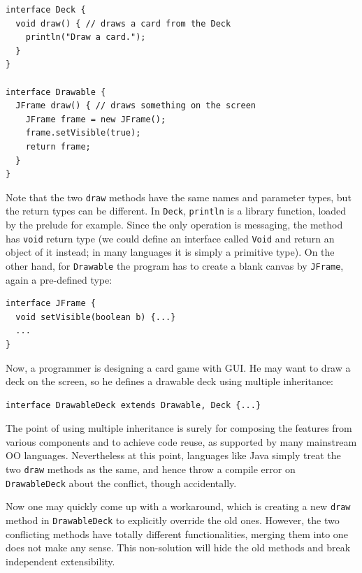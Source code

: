 \vspace{3pt}\begin{lstlisting}
interface Deck {
  void draw() { // draws a card from the Deck
    println("Draw a card.");
  }
}

interface Drawable {
  JFrame draw() { // draws something on the screen
    JFrame frame = new JFrame();
    frame.setVisible(true);
    return frame;
  }
}
\end{lstlisting}\vspace{3pt}
Note that the two \lstinline|draw| methods have the same names and parameter types,
but the return types can be different. In \lstinline|Deck|, \lstinline|println| is a
library function, loaded by the prelude for example. Since the only operation is messaging,
the method has \lstinline|void| return type (we could define an interface called \lstinline|Void|
and return an object of it instead; in many languages it is simply a primitive type). On the other hand, for \lstinline|Drawable|
the program has to create a blank canvas by \lstinline|JFrame|, again a pre-defined type:

\vspace{3pt}\begin{lstlisting}
interface JFrame {
  void setVisible(boolean b) {...}
  ...
}
\end{lstlisting}\vspace{3pt}
Now, a programmer is designing a
card game with GUI. He may want to draw a deck on the screen, so he defines a drawable
deck using multiple inheritance:

\vspace{3pt}\begin{lstlisting}
interface DrawableDeck extends Drawable, Deck {...} 
\end{lstlisting}\vspace{3pt}
The point of using multiple inheritance is surely for composing the features from various 
components and to achieve code reuse, as supported by many mainstream OO
languages. Nevertheless at this point, languages like Java simply treat the two \lstinline|draw| methods
as the same, and hence throw a compile error on \lstinline|DrawableDeck| about the conflict, though accidentally.

Now one may quickly come up with a workaround, which is creating a new \lstinline|draw| method in \lstinline|DrawableDeck| to
explicitly override the old ones. However, the two conflicting methods have totally different functionalities, merging
them into one does not make any sense. This non-solution will hide the
old methods and break independent extensibility. 

